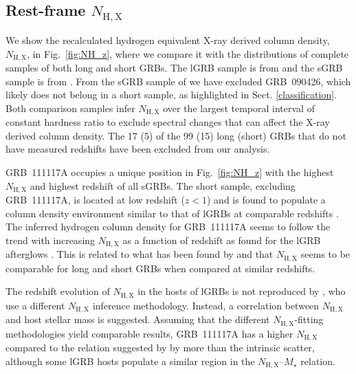 \documentclass[longauth]{aa}    %
\begin{document}
\subsection{Rest-frame $N_\mathrm{H,X}$ } \label{restnH}

We show the recalculated hydrogen equivalent X-ray derived column density,
$N_\mathrm{H,X}$, in Fig.~\ref{fig:NH_z}, where we compare it with the distributions
of complete samples of both long and short GRBs. The lGRB sample is from
\citet{Arcodia2016} and the sGRB sample is from \citet{DAvanzo2014a}. From the
sGRB sample of \citet{DAvanzo2014a} we have excluded GRB~090426, which 
likely does not belong in a short sample, as highlighted in Sect.
\ref{classification}. Both comparison samples infer $N_\mathrm{H,X}$  over the
largest temporal interval of constant hardness ratio to exclude spectral changes
that can affect the X-ray derived column density. The 17 (5) of the 99 (15) long
(short) GRBs that do not have measured redshifts have been excluded from our
analysis.

GRB~111117A occupies a unique position in Fig.~\ref{fig:NH_z} with the highest
$N_\mathrm{H,X}$ and highest redshift of all sGRBs. The short sample, excluding
GRB~111117A, is located at low redshift ($z < 1$) and is found to populate a
column density environment similar to that of lGRBs at comparable redshifts
\citep{DAvanzo2014a}. The inferred hydrogen column density for GRB~111117A seems
to follow the trend with increasing $N_\mathrm{H,X}$ as a function of redshift as found for
the lGRB afterglows \citep{Campana2010, Starling2013, Arcodia2016}. This is
related to what has been found by \citet{Kopac2012} and \citet{Margutti2013} that $N_\mathrm{H,X}$ seems to
be comparable for long and short GRBs when compared at similar redshifts.

The redshift evolution of $N_\mathrm{H,X}$ in the hosts of lGRBs is not
reproduced by \citet{Buchner2017}, who use  a different $N_\mathrm{H,X}$ inference
methodology. Instead, a correlation between $N_\mathrm{H,X}$ and host stellar
mass is suggested. Assuming that the different $N_\mathrm{H,X}$-fitting
methodologies yield comparable results, GRB~111117A has a higher
$N_\mathrm{H,X}$ compared to the relation suggested by \citet{Buchner2017} by
more than the intrinsic scatter, although some lGRB hosts populate a similar
region in the $N_\mathrm{H,X}$--$M_\star$ relation.
\end{document}
